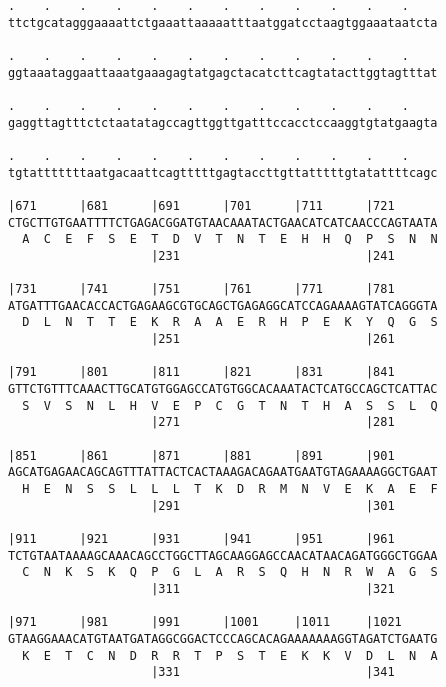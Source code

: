 \documentclass{article}
\begin{document}
\begin{Verbatim}
.    .    .    .    .    .    .    .    .    .    .    .    
ttctgcatagggaaaattctgaaattaaaaatttaatggatcctaagtggaaataatcta
                                                            
.    .    .    .    .    .    .    .    .    .    .    .    
ggtaaataggaattaaatgaaagagtatgagctacatcttcagtatacttggtagtttat
                                                            
.    .    .    .    .    .    .    .    .    .    .    .    
gaggttagtttctctaatatagccagttggttgatttccacctccaaggtgtatgaagta
                                                            
.    .    .    .    .    .    .    .    .    .    .    .    
tgtatttttttaatgacaattcagtttttgagtaccttgttatttttgtatattttcagc
                                                            
|671      |681      |691      |701      |711      |721      
CTGCTTGTGAATTTTCTGAGACGGATGTAACAAATACTGAACATCATCAACCCAGTAATA
  A  C  E  F  S  E  T  D  V  T  N  T  E  H  H  Q  P  S  N  N
                    |231                          |241      
  
|731      |741      |751      |761      |771      |781      
ATGATTTGAACACCACTGAGAAGCGTGCAGCTGAGAGGCATCCAGAAAAGTATCAGGGTA
  D  L  N  T  T  E  K  R  A  A  E  R  H  P  E  K  Y  Q  G  S
                    |251                          |261      
  
|791      |801      |811      |821      |831      |841      
GTTCTGTTTCAAACTTGCATGTGGAGCCATGTGGCACAAATACTCATGCCAGCTCATTAC
  S  V  S  N  L  H  V  E  P  C  G  T  N  T  H  A  S  S  L  Q
                    |271                          |281      
  
|851      |861      |871      |881      |891      |901      
AGCATGAGAACAGCAGTTTATTACTCACTAAAGACAGAATGAATGTAGAAAAGGCTGAAT
  H  E  N  S  S  L  L  L  T  K  D  R  M  N  V  E  K  A  E  F
                    |291                          |301      
  
|911      |921      |931      |941      |951      |961      
TCTGTAATAAAAGCAAACAGCCTGGCTTAGCAAGGAGCCAACATAACAGATGGGCTGGAA
  C  N  K  S  K  Q  P  G  L  A  R  S  Q  H  N  R  W  A  G  S
                    |311                          |321      
  
|971      |981      |991      |1001     |1011     |1021     
GTAAGGAAACATGTAATGATAGGCGGACTCCCAGCACAGAAAAAAAGGTAGATCTGAATG
  K  E  T  C  N  D  R  R  T  P  S  T  E  K  K  V  D  L  N  A
                    |331                          |341      
  

\end{Verbatim}
\end{document}
